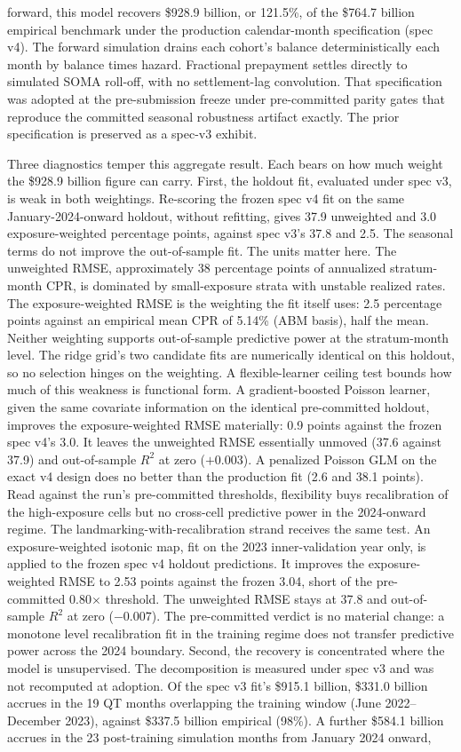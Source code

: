 \documentclass[12pt]{article}
\begin{document}
forward, this model recovers \$928.9 billion, or 121.5\%, of the \$764.7 billion empirical benchmark under the production calendar-month specification (spec v4). The forward simulation drains each cohort's balance deterministically each month by balance times hazard. Fractional prepayment settles directly to simulated SOMA roll-off, with no settlement-lag convolution. That specification was adopted at the pre-submission freeze under pre-committed parity gates that reproduce the committed seasonal robustness artifact exactly. The prior specification is preserved as a spec-v3 exhibit.

Three diagnostics temper this aggregate result. Each bears on how much weight the \$928.9 billion figure can carry. First, the holdout fit, evaluated under spec v3, is weak in both weightings. Re-scoring the frozen spec v4 fit on the same January-2024-onward holdout, without refitting, gives 37.9 unweighted and 3.0 exposure-weighted percentage points, against spec v3's 37.8 and 2.5. The seasonal terms do not improve the out-of-sample fit. The units matter here. The unweighted RMSE, approximately 38 percentage points of annualized stratum-month CPR, is dominated by small-exposure strata with unstable realized rates. The exposure-weighted RMSE is the weighting the fit itself uses: 2.5 percentage points against an empirical mean CPR of 5.14\% (ABM basis), half the mean. Neither weighting supports out-of-sample predictive power at the stratum-month level. The ridge grid's two candidate fits are numerically identical on this holdout, so no selection hinges on the weighting. A flexible-learner ceiling test bounds how much of this weakness is functional form. A gradient-boosted Poisson learner, given the same covariate information on the identical pre-committed holdout, improves the exposure-weighted RMSE materially: 0.9 points against the frozen spec v4's 3.0. It leaves the unweighted RMSE essentially unmoved (37.6 against 37.9) and out-of-sample $R^2$ at zero ($+0.003$). A penalized Poisson GLM on the exact v4 design does no better than the production fit (2.6 and 38.1 points). Read against the run's pre-committed thresholds, flexibility buys recalibration of the high-exposure cells but no cross-cell predictive power in the 2024-onward regime. The landmarking-with-recalibration strand receives the same test. An exposure-weighted isotonic map, fit on the 2023 inner-validation year only, is applied to the frozen spec v4 holdout predictions. It improves the exposure-weighted RMSE to 2.53 points against the frozen 3.04, short of the pre-committed 0.80$\times$ threshold. The unweighted RMSE stays at 37.8 and out-of-sample $R^2$ at zero ($-0.007$). The pre-committed verdict is no material change: a monotone level recalibration fit in the training regime does not transfer predictive power across the 2024 boundary. Second, the recovery is concentrated where the model is unsupervised. The decomposition is measured under spec v3 and was not recomputed at adoption. Of the spec v3 fit's \$915.1 billion, \$331.0 billion accrues in the 19 QT months overlapping the training window (June 2022--December 2023), against \$337.5 billion empirical (98\%). A further \$584.1 billion accrues in the 23 post-training simulation months from January 2024 onward, 
\end{document}
